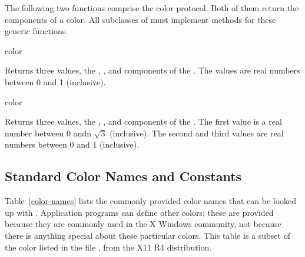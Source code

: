 The following two functions comprise the color protocol.  Both of them return
the components of a color.  All subclasses of  must implement methods
for these generic functions.

 {color}

Returns three values, the , , and  components of
the  . The values are real numbers between 0 and 1
(inclusive).

 {color}

Returns three values, the , , and 
components of the  .  The first value is a real number
between 0 andn $\sqrt{3}$ (inclusive).  The second and third values are real
numbers between 0 and 1 (inclusive).


\subsection {Standard Color Names and Constants}

Table~\ref{color-names} lists the commonly provided color names that can be
looked up with .  Application programs can define other
colors; these are provided because they are commonly used in the X Windows
community, not because there is anything special about these particular colors.
This table is a subset of the color listed in the file
, from the X11 R4 distribution.

